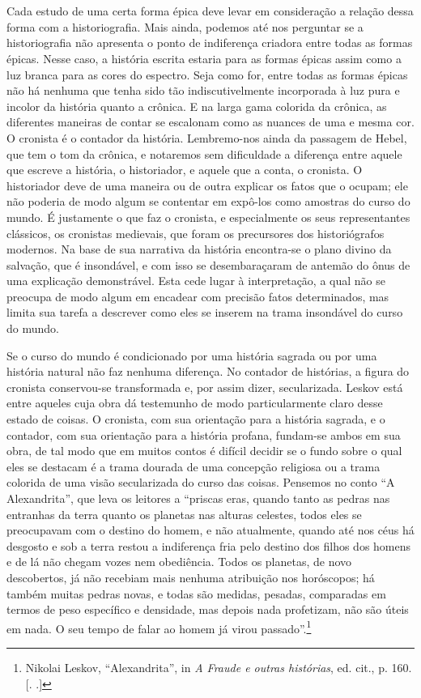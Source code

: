 \section{}

Cada estudo de uma certa forma épica deve levar em consideração a
relação dessa forma com a historiografia. Mais ainda, podemos até
nos perguntar se a historiografia não apresenta o ponto de indiferença
criadora entre todas as formas épicas. Nesse caso, a história escrita
estaria para as formas épicas assim como a luz branca para as cores do
espectro. Seja como for, entre todas as formas épicas não há nenhuma que
tenha sido tão indiscutivelmente incorporada à luz pura e incolor da
história quanto a crônica. E na larga gama colorida da crônica, as
diferentes maneiras de contar se escalonam como as nuances de uma e
mesma cor. O cronista é o contador da história. Lembremo-nos ainda da
passagem de Hebel, que tem o tom da crônica, e notaremos sem dificuldade
a diferença entre aquele que escreve a história, o historiador, e aquele
que a conta, o cronista. O historiador deve de uma maneira ou de outra
explicar os fatos que o ocupam; ele não poderia de modo algum se
contentar em expô-los como amostras do curso do mundo. É justamente o
que faz o cronista, e especialmente os seus representantes clássicos, os
cronistas medievais, que foram os precursores dos historiógrafos
modernos. Na base de sua narrativa da história encontra-se o plano
divino da salvação, que é insondável, e com isso se desembaraçaram de
antemão do ônus de uma explicação demonstrável. Esta cede lugar à
interpretação, a qual não se preocupa de modo algum em encadear com
precisão fatos determinados, mas limita sua tarefa a descrever como
eles se inserem na trama insondável do curso do mundo.

Se o curso do mundo é condicionado por uma história sagrada ou por uma
história natural não faz nenhuma diferença. No contador de histórias, a
figura do cronista conservou-se transformada e, por assim dizer,
secularizada. Leskov está entre aqueles cuja obra dá testemunho de modo
particularmente claro desse estado de coisas. O cronista, com sua
orientação para a história sagrada, e o contador, com sua orientação
para a história profana, fundam-se ambos em sua obra, de tal modo que em
muitos contos é difícil decidir se o fundo sobre o qual eles se
destacam é a trama dourada de uma concepção religiosa ou a trama
colorida de uma visão secularizada do curso das coisas. Pensemos no
conto ``A Alexandrita'', que leva os leitores a ``priscas eras, quando
tanto as pedras nas entranhas da terra quanto os planetas nas alturas
celestes, todos eles se preocupavam com o destino do homem, e não
atualmente, quando até nos céus há desgosto e sob a terra restou a
indiferença fria pelo destino dos filhos dos homens e de lá não chegam
vozes nem obediência. Todos os planetas, de novo descobertos, já não
recebiam mais nenhuma atribuição nos horóscopos; há também muitas pedras
novas, e todas são medidas, pesadas, comparadas em termos de peso
específico e densidade, mas depois nada profetizam, não são úteis em
nada. O seu tempo de falar ao homem já virou passado''.\footnote{Nikolai
  Leskov, ``Alexandrita'', in \emph{A Fraude e outras histórias}, ed.
  cit., p. 160. [. .]}


